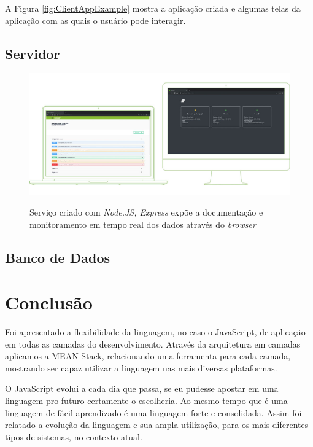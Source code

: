 \documentclass[
	12pt,				%
	openright,			%
	twoside,			%
	a4paper,			%
	english,			%
	brazil				%
	]{abntex2}
\begin{document}
A Figura \ref{fig:ClientAppExample} mostra a aplicação criada e algumas telas da aplicação com as quais o usuário pode interagir.

\section{Servidor}

\begin{figure}[h]
	\centering

    \caption{Serviço criado com \textit{Node.JS, Express} expõe a documentação e monitoramento em tempo real dos dados através do \textit{browser}} \label{fig:ServerAppExample}
    \includegraphics[scale=0.45]{server-app} \\

\end{figure}

\section{Banco de Dados}

\chapter{Conclusão}
Foi apresentado a flexibilidade da linguagem, no caso o JavaScript, de aplicação em todas as camadas do desenvolvimento. Através da arquitetura em camadas aplicamos a MEAN Stack, relacionando uma ferramenta para cada camada, mostrando ser capaz utilizar a linguagem nas mais diversas plataformas.

O JavaScript evolui a cada dia que passa, se eu pudesse apostar em uma linguagem pro futuro certamente o escolheria. Ao mesmo tempo que é uma linguagem de fácil aprendizado é uma linguagem forte e consolidada. Assim foi relatado a evolução da linguagem e sua ampla utilização, para os mais diferentes tipos de sistemas, no contexto atual.
\end{document}
